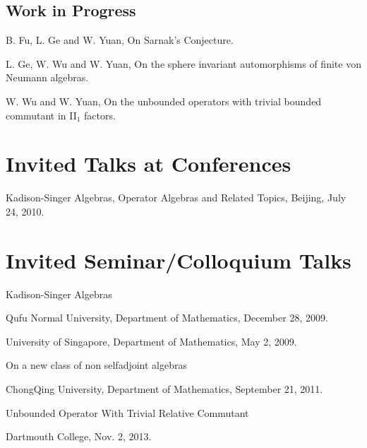 \documentclass[letterpaper]{article}
\renewenvironment{itemize}{
  \begin{list}{}{
    \setlength{\leftmargin}{1.5em}
  }
}{
  \end{list}
}
\begin{document}
    
\subsection*{Work in Progress}
\begin{itemize}
\item B. Fu, L. Ge and W. Yuan, On Sarnak's Conjecture.
\item L. Ge, W. Wu and W. Yuan, On the sphere invariant automorphisms of
finite von Neumann algebras.
\item W. Wu and W. Yuan, On the unbounded operators with trivial
bounded commutant in II$_1$ factors.
\end{itemize}

\section*{Invited Talks at Conferences}
\begin{itemize}
  \item Kadison-Singer Algebras, Operator Algebras and Related Topics, Beijing, July 24, 2010.
\end{itemize}

\section*{Invited Seminar/Colloquium Talks}
\begin{itemize}
    \item Kadison-Singer Algebras
    \begin{itemize}
       \item Qufu Normal University, Department of Mathematics, December 28, 2009.
        \item University of Singapore, Department of Mathematics, May 2, 2009.
     \end{itemize}
    \item On a new class of non selfadjoint algebras
    \begin{itemize}
       \item ChongQing University, Department of Mathematics, September 21, 2011.
     \end{itemize}
 \item Unbounded Operator With Trivial Relative Commutant
     \begin{itemize}
         \item Dartmouth College, Nov. 2, 2013.
     \end{itemize} 
\end{itemize}
\end{document}
